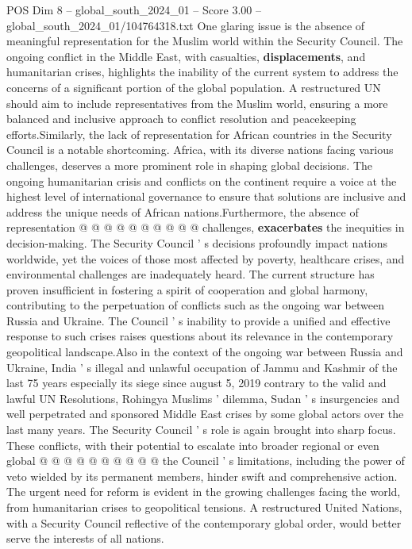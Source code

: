 \begin{textsample}{POS Dim 8 – global\_south\_2024\_01 – Score 3.00 – global\_south\_2024\_01/104764318.txt}
One glaring issue is the absence of meaningful representation for the Muslim world within the Security Council.
The ongoing conflict in the Middle East, with casualties, \textbf{displacements}, and humanitarian crises, highlights the inability of the current system to address the concerns of a significant portion of the global population.
A restructured UN should aim to include representatives from the Muslim world, ensuring a more balanced and inclusive approach to conflict resolution and peacekeeping efforts.Similarly, the lack of representation for African countries in the Security Council is a notable shortcoming.
Africa, with its diverse nations facing various challenges, deserves a more prominent role in shaping global decisions.
The ongoing humanitarian crisis and conflicts on the continent require a voice at the highest level of international governance to ensure that solutions are inclusive and address the unique needs of African nations.Furthermore, the absence of representation @ @ @ @ @ @ @ @ @ @ challenges, \textbf{exacerbates} the inequities in decision-making.
The Security Council ' s decisions profoundly impact nations worldwide, yet the voices of those most affected by poverty, healthcare crises, and environmental challenges are inadequately heard.
The current structure has proven insufficient in fostering a spirit of cooperation and global harmony, contributing to the perpetuation of conflicts such as the ongoing war between Russia and Ukraine.
The Council ' s inability to provide a unified and effective response to such crises raises questions about its relevance in the contemporary geopolitical landscape.Also in the context of the ongoing war between Russia and Ukraine, India ' s illegal and unlawful occupation of Jammu and Kashmir of the last 75 years especially its siege since august 5, 2019 contrary to the valid and lawful UN Resolutions, Rohingya Muslims ' dilemma, Sudan ' s insurgencies and well perpetrated and sponsored Middle East crises by some global actors over the last many years.
The Security Council ' s role is again brought into sharp focus.
These conflicts, with their potential to escalate into broader regional or even global @ @ @ @ @ @ @ @ @ @ the Council ' s limitations, including the power of veto wielded by its permanent members, hinder swift and comprehensive action.
The urgent need for reform is evident in the growing challenges facing the world, from humanitarian crises to geopolitical tensions.
A restructured United Nations, with a Security Council reflective of the contemporary global order, would better serve the interests of all nations.

\end{textsample}
